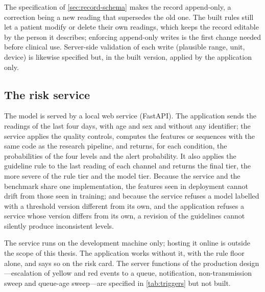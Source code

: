 The specification of \cref{sec:record-schema} makes the record append-only, a correction being a new reading that supersedes the old one. The built rules still let a patient modify or delete their own readings, which keeps the record editable by the person it describes; enforcing append-only writes is the first change needed before clinical use. Server-side validation of each write (plausible range, unit, device) is likewise specified but, in the built version, applied by the application only.

\subsection{The risk service}\label{sec:risk-service}\label{sec:functions}\label{sec:sweeps}

The model is served by a local web service (FastAPI). The application sends the readings of the last four days, with age and sex and without any identifier; the service applies the quality controls, computes the features or sequences with the same code as the research pipeline, and returns, for each condition, the probabilities of the four levels and the alert probability. It also applies the guideline rule to the last reading of each channel and returns the final tier, the more severe of the rule tier and the model tier. Because the service and the benchmark share one implementation, the features seen in deployment cannot drift from those seen in training; and because the service refuses a model labelled with a threshold version different from its own, and the application refuses a service whose version differs from its own, a revision of the guidelines cannot silently produce inconsistent levels.

The service runs on the development machine only; hosting it online is outside the scope of this thesis. The application works without it, with the rule floor alone, and says so on the risk card. The server functions of the production design---escalation of yellow and red events to a queue, notification, non-transmission sweep and queue-age sweep---are specified in \cref{tab:triggers} but not built.

